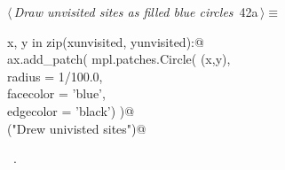\documentclass[11.5pt]{report}
\begin{document}
\begin{flushleft} \small\label{scrap58}\raggedright\small
{} $\langle\,${\itshape Draw unvisited sites as filled blue circles}\nobreak\ {\footnotesize {42a}}$\,\rangle\equiv$
\vspace{-1ex}
\begin{list}{}{} \item
\mbox{}\verb@for x, y in zip(xunvisited, yunvisited):@\\
\mbox{}\verb@     ax.add_patch( mpl.patches.Circle( (x,y),\@\\
\mbox{}\verb@                                    radius    = 1/100.0,\@\\
\mbox{}\verb@                                    facecolor = 'blue',\@\\
\mbox{}\verb@                                    edgecolor = 'black')  )@\\
\mbox{}\verb@debug("Drew univisted sites")@\\
\mbox{}\verb@@{\NWsep}
\end{list}
\vspace{-1.5ex}
\footnotesize
\begin{list}{}{\setlength{\itemsep}{-\parsep}\setlength{\itemindent}{-\leftmargin}}
\item \NWtxtMacroRefIn\ .

\item{}
\end{list}
\vspace{4ex}
\end{flushleft}


\vspace{-0.8cm}\newchunk 
\end{document}
